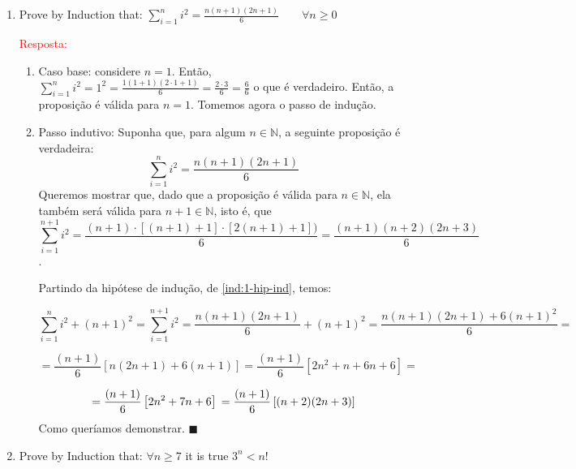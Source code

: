 \documentclass{article}
\newcommand*{\QEDA}{\hfill\ensuremath{\blacksquare}}%
\begin{document}
\begin{enumerate}
  \item Prove by Induction that:
  \( \sum_{i=1}^{n}i^2=\frac{n(n+1)(2n+1)}{6} \qquad\forall n \geq 0\)
    
    \textcolor{red}{Resposta: }
    \begin{enumerate}[itemsep=0pt, label=(\roman*)]
        \item Caso base: considere $n=1$. Então, 
        $\sum_{i=1}^{n} i^2= 1^2 = \frac{1(1+1)(2\cdot 1 + 1)}{6} = \frac{2 \cdot 3}{6} = \frac{6}{6}$
        o que é verdadeiro. Então, a proposição é válida para $n=1$. Tomemos agora o passo de indução. 
        
        \item Passo indutivo: Suponha que, para algum $n \in \mathbb{N}$, a seguinte proposição é verdadeira: 
        \begin{equation} \label{ind:1-hip-ind}
            \sum_{i=1}^{n}i^2 = \frac{n(n+1)(2n+1)}{6}
        \end{equation}
        Queremos mostrar que, dado que a proposição é válida para $n \in \mathbb{N}$, ela também será válida para $n+1 \in \mathbb{N}$, isto é, que 
        $$\sum_{i=1}^{n+1}i^2 = \frac{(n+1)\cdot [(n+1)+1]\cdot [2(n+1)+1])}{6} =\frac{(n+1)(n+2)(2n+3)}{6}$$. 
        
        Partindo da hipótese de indução, de \ref{ind:1-hip-ind}, temos:
        
        \begin{equation*}
            \sum_{i=1}^{n}i^2 + (n+1)^2 = \sum_{i=1}^{n+1}i^2= \frac{n(n+1)(2n+1)}{6} + (n+1)^2 = \frac{n(n+1)(2n+1) + 6(n+1)^2}{6} = 
        \end{equation*}
        
        \begin{equation*}
             = \frac{(n+1)}{6}\left[  n(2n+1) + 6(n+1)\right] = \frac{(n+1)}{6}\left[ 2n^2 + n + 6n + 6\right] = 
        \end{equation*}
        
        \begin{equation*}
            = \frac{(n+1)}{6}\left[  2n^2 + 7n + 6 \right] \\ = \frac{(n+1)}{6}\left[ (n+2)(2n+3) \right]
        \end{equation*}
        Como queríamos demonstrar. \QEDA
    \end{enumerate}
    
  \item Prove by Induction that:
  $\forall n \geq 7$ it is true $3^n<n!$
  

\end{enumerate}
\end{document}
